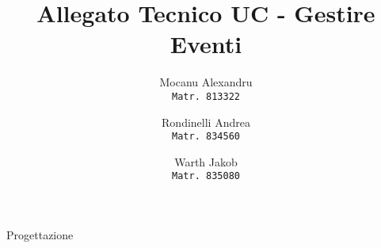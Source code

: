 \documentclass[14pt]{extarticle}
\title{Allegato Tecnico UC - Gestire Eventi}
\author{
  Mocanu Alexandru\\
  \texttt{Matr. 813322}
  \and
  Rondinelli Andrea\\
  \texttt{Matr. 834560}
  \and
  Warth Jakob\\
  \texttt{Matr. 835080}
}
\date{}
\begin{document}
\maketitle
\centering
\vspace{\fill}
\Huge{Progettazione}
\end{document}
